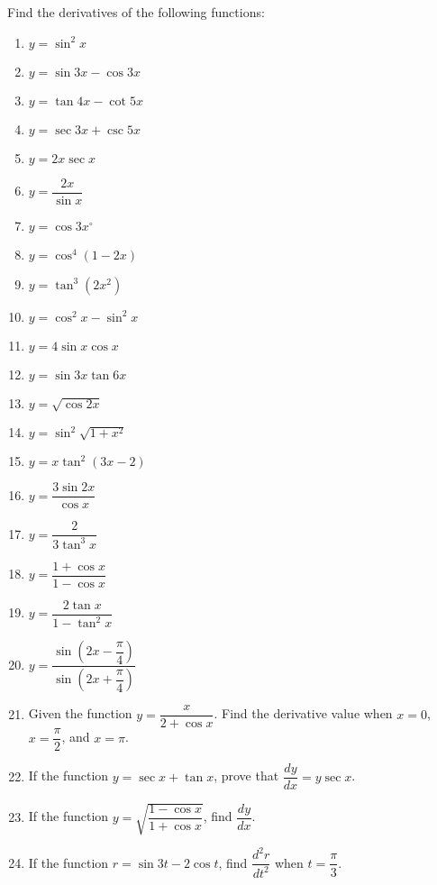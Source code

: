 \documentclass[12pt]{report}
\begin{document}
Find the derivatives of the following functions:
\setlength{\columnseprule}{1pt} \setlength{\columnsep}{24pt}
\begin{multicols}{2}
    \begin{enumerate}
        \item $y=\sin^{2}x$
        \item $y=\sin{3x}-\cos{3x}$
        \item $y=\tan4x-\cot5x$
        \item $y=\sec3x+\csc5x$
        \item $y=2x\sec x$
        \item $y=\dfrac{2x}{\sin x}$
        \item $y=\cos3x^{\circ}$
        \item $y=\cos^{4}(1-2x)$
        \item $y=\tan^{3}\left(2x^{2}\right)$
        \item $y=\cos^{2}x-\sin^{2}x$
        \item $y=4\sin x\cos x$
        \item $y=\sin3x\tan6x$
        \item $y=\sqrt{\cos2x}$
        \item $y=\sin^{2}\sqrt{1+x^{2}}$
        \item $y=x\tan^{2}(3x-2)$
        \item $y=\dfrac{3\sin2x}{\cos x}$
        \item $y={\dfrac{2}{3\tan^{3}x}}$
        \item $y={\dfrac{1+\cos x}{1-\cos x}}$
        \item $y={\dfrac{2\tan x}{1-\tan^{2}x}}$
        \item $y={\dfrac{\sin\left(2x-{\dfrac{\pi}{4}}\right)}{\sin\left(2x+{\dfrac{\pi}{4}}\right)}}$
    \end{enumerate}
\end{multicols}

\begin{enumerate}
    \setcounter{enumi}{20}
    \item Given the function $y = \dfrac{x}{2 + \cos x}$. Find the derivative value when
          $x = 0$, $x = \dfrac{\pi}{2}$, and $x = \pi$.
    \item If the function $y = \sec x + \tan x$, prove that $\dfrac{dy}{dx} = y\sec x$.
    \item If the function $y = \sqrt{\dfrac{1 - \cos x}{1 + \cos x}}$, find
          $\dfrac{dy}{dx}$.
    \item If the function $r = \sin 3t - 2\cos t$, find $\dfrac{d^2r}{dt^2}$ when $t =
              \dfrac{\pi}{3}$.
\end{enumerate}
\end{document}
